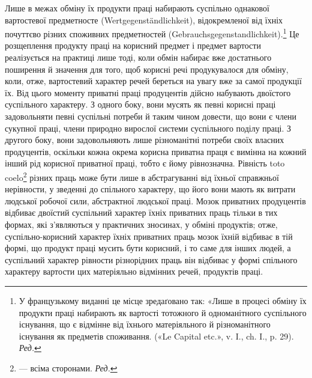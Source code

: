 Лише в межах обміну їх продукти праці набирають суспільно
однакової вартостевої предметносте (Wertgegenständlichkeit), відокремленої
від їхніх почуттєво різних споживних предметностей
(Gebrauchsgegenstandlichkeit).\footnote*{
У французькому виданні це місце зредаґовано так: «Лише в процесі
обміну їх продукти праці набирають як вартості тотожного й одноманітного
суспільного існування, що є відмінне від їхнього матеріяльного
й різноманітного існування як предметів споживання. («Le Capital
etc.», v. I., ch. I., p. 29). \emph{Ред.}
} Це розщеплення продукту праці
на корисний предмет і предмет вартости реалізується на практиці
лише тоді, коли обмін набирає вже достатнього поширення й значення
для того, щоб корисні речі продукувалося для обміну, коли,
отже, вартостевий характер речей береться на увагу вже за самої
продукції їх. Від цього моменту приватні праці продуцентів
дійсно набувають двоїстого суспільного характеру. З одного боку,
вони мусять як певні корисні праці задовольняти певні суспільні
потреби й таким чином довести, що вони є члени сукупної праці,
члени природно вирослої системи суспільного поділу праці. З другого
боку, вони задовольняють лише різноманітні потреби своїх
власних продуцентів, оскільки кожна окрема корисна приватна
праця є вимінна на кожний інший рід корисної приватної праці,
тобто є йому рівнозначна. Рівність toto coelo\footnote*{
— всіма сторонами. \emph{Ред.}
} різних праць може
бути лише в абстрагуванні від їхньої справжньої нерівности, у
зведенні до спільного характеру, що його вони мають як витрати
людської робочої сили, абстрактної людської праці. Мозок приватних
продуцентів відбиває двоїстий суспільний характер їхніх
приватних праць тільки в тих формах, які з’являються у практичних
зносинах, у обміні продуктів; отже, суспільно-корисний
характер їхніх приватних праць мозок їхній відбиває в тій формі,
що продукт праці мусить бути корисний, і то саме для інших
людей, а суспільний характер рівности різнорідних праць він
відбиває у формі спільного характеру вартости цих матеріяльно
відмінних речей, продуктів праці.

